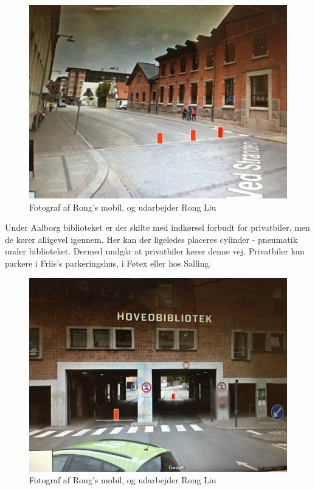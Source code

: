 \begin{figure}[htbp]
  \centering
  \begin{adjustbox}{max width=\textwidth}
    \includegraphics{figures/Billederogfigur/3.jpg}
 \end{adjustbox}
  \caption{ Fotograf af Rong’s mobil, og udarbejder Rong Liu}
   \label{fig: Fotograf af Rong}
\end{figure}
Under Aalborg biblioteket er der skilte med indkørsel forbudt for privatbiler, men de kører alligevel igennem. Her kan der ligeledes placeres cylinder - pneumatik under biblioteket. Dermed undgår at privatbiler kører denne vej. Privatbiler kan parkere i Friis’s parkeringshus, i Føtex eller hos Salling.
\begin{figure}[htbp]
  \centering
  \begin{adjustbox}{max width=\textwidth}
    \includegraphics{figures/Billederogfigur/4.jpg}
 \end{adjustbox}
  \caption{ Fotograf af Rong’s mobil, og udarbejder Rong Liu}
   \label{fig: Fotograf af Rong}
\end{figure}

